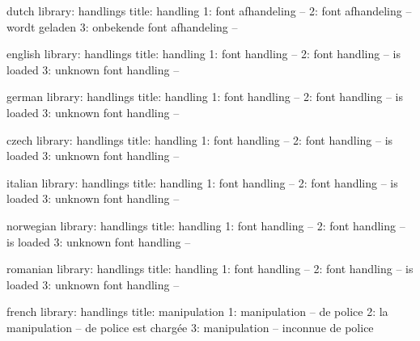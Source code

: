 



\unprotect

\startmessages  dutch  library: handlings
  title: handling
      1: font afhandeling --
      2: font afhandeling -- wordt geladen
      3: onbekende font afhandeling --
\stopmessages

\startmessages  english  library: handlings
  title: handling
      1: font handling --
      2: font handling -- is loaded
      3: unknown font handling --
\stopmessages

\startmessages  german  library: handlings %
  title: handling
      1: font handling --
      2: font handling -- is loaded
      3: unknown font handling --
\stopmessages

\startmessages  czech  library: handlings %
  title: handling
      1: font handling --
      2: font handling -- is loaded
      3: unknown font handling --
\stopmessages

\startmessages  italian  library: handlings %
  title: handling
      1: font handling --
      2: font handling -- is loaded
      3: unknown font handling --
\stopmessages

\startmessages  norwegian  library: handlings %
  title: handling
      1: font handling --
      2: font handling -- is loaded
      3: unknown font handling --
\stopmessages

\startmessages  romanian  library: handlings %
  title: handling
      1: font handling --
      2: font handling -- is loaded
      3: unknown font handling --
\stopmessages

\startmessages  french  library: handlings
  title: manipulation
      1: manipulation -- de police
      2: la manipulation -- de police est chargée
      3: manipulation -- inconnue de police
\stopmessages

